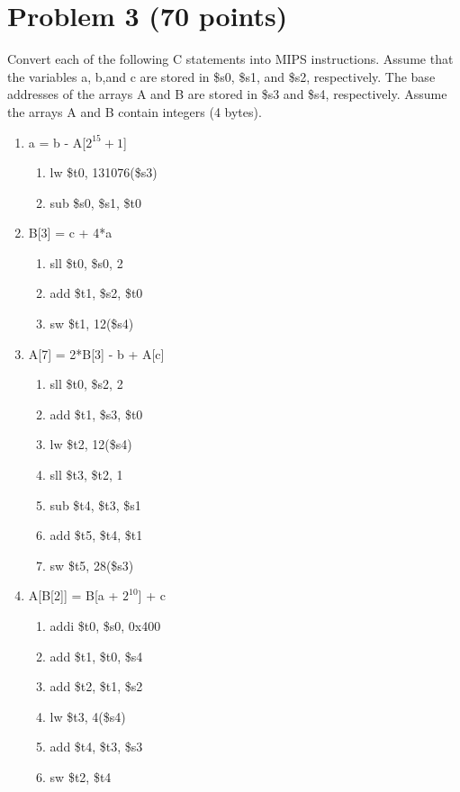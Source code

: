 \documentclass{article}
\begin{document}
\section*{Problem 3 (70 points)}
Convert each of the following C statements into MIPS instructions.  Assume that the variables a, b,and c are stored in \$s0, \$s1, and \$s2, respectively.  The base addresses of the arrays A and B are stored in \$s3 and \$s4, respectively.  Assume the arrays A and B contain integers (4 bytes).
\begin{enumerate}
    \item a = b - A[$2^{15} + 1$]
    \begin{enumerate}
        \item lw \$t0, 131076(\$s3) 
        \item sub \$s0, \$s1, \$t0
    \end{enumerate}
    \item B[3] = c + 4*a
    \begin{enumerate}
        \item sll \$t0, \$s0, 2
        \item add \$t1, \$s2, \$t0
        \item sw \$t1, 12(\$s4)
    \end{enumerate}
    \item A[7] = 2*B[3] - b + A[c]
    \begin{enumerate}
        \item sll \$t0, \$s2, 2
        \item add \$t1, \$s3, \$t0
        \item lw \$t2, 12(\$s4)
        \item sll \$t3, \$t2, 1
        \item sub \$t4, \$t3, \$s1
        \item add \$t5, \$t4, \$t1
        \item sw \$t5, 28(\$s3)
    \end{enumerate}
    \item A[B[2]] = B[a + $2^{10}$] + c
    \begin{enumerate}
        \item addi \$t0, \$s0, 0x400
        \item add \$t1, \$t0, \$s4
        \item add \$t2, \$t1, \$s2
        \item lw \$t3, 4(\$s4)
        \item add \$t4, \$t3, \$s3
        \item sw \$t2, \$t4
    \end{enumerate}
\end{enumerate}
\end{document}
